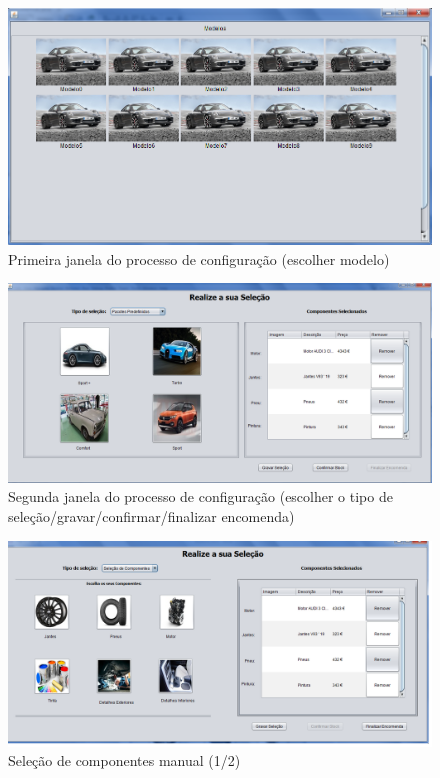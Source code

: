 \begin{figure}
    \centering
    \includegraphics[width=\textwidth]{analise_de_requisitos/img/config_escolher_modelo.png}
    \caption{Primeira janela do processo de configuração (escolher modelo)}
\end{figure}

\begin{figure}
    \centering
    \includegraphics[width=\textwidth]{analise_de_requisitos/img/config_guardar_finalizar.png}
    \caption{Segunda janela do processo de configuração (escolher o tipo de seleção/gravar/confirmar/finalizar encomenda)}
\end{figure}

\begin{figure}
    \centering
    \includegraphics[width=\textwidth]{analise_de_requisitos/img/config_selecao_componentes_manual_1.png}
    \caption{Seleção de componentes manual (1/2)}
\end{figure}

